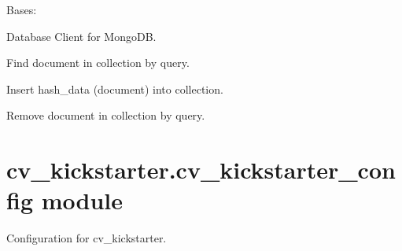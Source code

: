 \documentclass[letterpaper,10pt,english]{sphinxmanual}
\begin{document}
\begin{fulllineitems}
\label{cv_kickstarter:cv_kickstarter.course_repository.MongoStore}
Bases: 

Database Client for MongoDB.

\begin{fulllineitems}
\label{cv_kickstarter:cv_kickstarter.course_repository.MongoStore.find}
Find document in collection by query.

\end{fulllineitems}


\begin{fulllineitems}
\label{cv_kickstarter:cv_kickstarter.course_repository.MongoStore.insert}
Insert hash\_data (document) into collection.

\end{fulllineitems}


\begin{fulllineitems}
\label{cv_kickstarter:cv_kickstarter.course_repository.MongoStore.remove}
Remove document in collection by query.

\end{fulllineitems}


\end{fulllineitems}



\section{cv\_kickstarter.cv\_kickstarter\_config module}
\label{cv_kickstarter:cv-kickstarter-cv-kickstarter-config-module}\label{cv_kickstarter:module-cv_kickstarter.cv_kickstarter_config}
Configuration for cv\_kickstarter.
\end{document}
